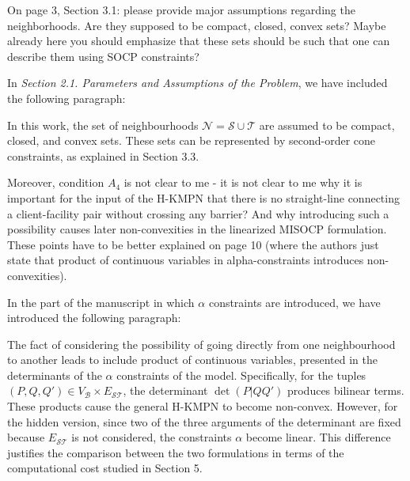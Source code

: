 \documentclass{article}
\newenvironment{reviewer}{\setcounter{pointcounter}{1}}{}
\newcommand{\point}{\text{{\selectfont \thepointcounter} \stepcounter{pointcounter}}}
\begin{document}
\begin{reviewer}
		\begin{itshape}
			On page 3, Section 3.1: please provide major assumptions regarding the neighborhoods. Are they supposed to be compact, closed, convex sets? Maybe already here you should emphasize that these sets should be such that one can describe them using SOCP constraints?
		\end{itshape}
		
		\begin{tcolorbox}[breakable,enhanced,coltitle=black,colback=green!5!white,colframe=green!75!black,title=\textbf{Answer R2.\point},borderline={1pt}{0pt}{black},boxrule=0pt]
			In \textit{Section 2.1. Parameters and Assumptions of the Problem}, we have included the following paragraph: 

			\medskip
			
			In this work, the set of neighbourhoods $\mathcal N=\mathcal S\cup\mathcal T$ are assumed to be compact, closed, and convex sets. These sets can be represented by second-order cone constraints, as explained in Section 3.3. 
		\end{tcolorbox}
		
		\begin{itshape}
			Moreover, condition $A_4$ is not clear to me - it is not clear to me why it is important for the input of the H-KMPN that there is no straight-line connecting a client-facility pair without crossing any barrier? And why introducing such a possibility causes later non-convexities in the linearized MISOCP formulation. These points have to be better explained on page 10 (where the authors just state that product of continuous variables in alpha-constraints introduces non-convexities).		
		\end{itshape}
	
		\begin{tcolorbox}[breakable,enhanced,coltitle=black,colback=green!5!white,colframe=green!75!black,title=\textbf{Answer R2.\point},borderline={1pt}{0pt}{black},boxrule=0pt]
			In the part of the manuscript in which $\alpha$ constraints are introduced, we have introduced the following paragraph:
			\medskip
			
			The fact of considering the possibility of going directly from one neighbourhood  to another leads to include product of continuous variables, presented in the determinants of the $\alpha$ constraints of the model. Specifically, for the tuples $(P, Q, Q')\in V_\mathcal B\times E_{\mathcal S\mathcal T}$, the determinant $\det(P|QQ')$ produces bilinear terms. These products cause the general H-KMPN to become non-convex. However, for the hidden version, since two of the three arguments of the determinant are fixed because $E_{\mathcal S\mathcal T}$ is not considered, the constraints $\alpha$ become linear. This difference justifies the comparison between the two formulations in terms of the computational cost studied in Section 5.
		\end{tcolorbox}
	

\end{reviewer}
\end{document}
